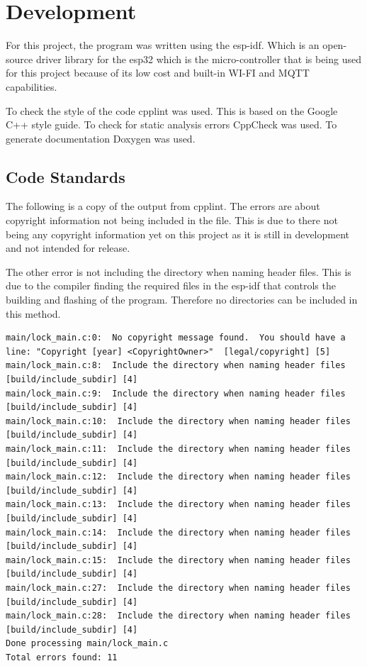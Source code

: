 \chapter{Development}

For this project, the program was written using the esp-idf. Which is an 
open-source driver library for the esp32 which is the micro-controller that is
being used for this project because of its low cost and built-in WI-FI
and MQTT capabilities.

To check the style of the code cpplint was used. This is based on the Google C++ style guide. 
To check for static analysis errors CppCheck was used. To generate documentation Doxygen was used.

\section{Code Standards}
The following is a copy of the output from cpplint. The errors are about copyright 
information not being included in the file. This is due to there not being any 
copyright information yet on this project as it is still in development and not 
intended for release. 

The other error is not including the directory when naming
header files. This is due to the compiler finding the required files in the esp-idf
that controls the building and flashing of the program. Therefore no directories can
be included in this method.
\begin{tiny}
\begin{verbatim}
main/lock_main.c:0:  No copyright message found.  You should have a line: "Copyright [year] <CopyrightOwner>"  [legal/copyright] [5]
main/lock_main.c:8:  Include the directory when naming header files  [build/include_subdir] [4]
main/lock_main.c:9:  Include the directory when naming header files  [build/include_subdir] [4]
main/lock_main.c:10:  Include the directory when naming header files  [build/include_subdir] [4]
main/lock_main.c:11:  Include the directory when naming header files  [build/include_subdir] [4]
main/lock_main.c:12:  Include the directory when naming header files  [build/include_subdir] [4]
main/lock_main.c:13:  Include the directory when naming header files  [build/include_subdir] [4]
main/lock_main.c:14:  Include the directory when naming header files  [build/include_subdir] [4]
main/lock_main.c:15:  Include the directory when naming header files  [build/include_subdir] [4]
main/lock_main.c:27:  Include the directory when naming header files  [build/include_subdir] [4]
main/lock_main.c:28:  Include the directory when naming header files  [build/include_subdir] [4]
Done processing main/lock_main.c
Total errors found: 11
\end{verbatim}
\end{tiny}

